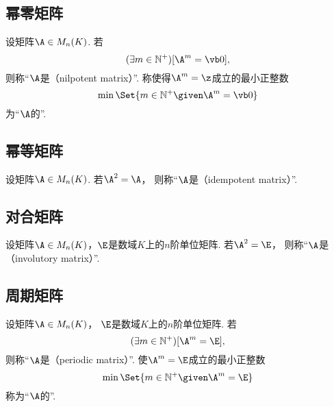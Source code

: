 \subsection{幂零矩阵}
\begin{definition}
设矩阵\(\A \in M_n(K)\).
若\[
	(\exists m\in\mathbb{N}^+)
	[\A^m = \vb0],
\]
则称“\(\A\)是（nilpotent matrix）”.
称使得\(\A^m = \z\)成立的最小正整数\[
    \min\Set{ m\in\mathbb{N}^+ \given \A^m = \vb0 }
\]为“\(\A\)的”.
\end{definition}

\subsection{幂等矩阵}
\begin{definition}
设矩阵\(\A \in M_n(K)\).
若\(\A^2=\A\)，
则称“\(\A\)是（idempotent matrix）”.
\end{definition}

\subsection{对合矩阵}
\begin{definition}
设矩阵\(\A \in M_n(K)\)，\(\E\)是数域\(K\)上的\(n\)阶单位矩阵.
若\(\A^2=\E\)，
则称“\(\A\)是（involutory matrix）”.
\end{definition}

\subsection{周期矩阵}
\begin{definition}
设矩阵\(\A \in M_n(K)\)，
\(\E\)是数域\(K\)上的\(n\)阶单位矩阵.
若\[
	(\exists m\in\mathbb{N}^+)
	[\A^m = \E],
\]
则称“\(\A\)是（periodic matrix）”.
使\(\A^m = \E\)成立的最小正整数\[
	\min\Set{ m\in\mathbb{N}^+ \given \A^m = \E }
\]称为“\(\A\)的”.
\end{definition}

